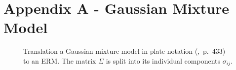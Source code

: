 \section*{Appendix A - Gaussian Mixture Model}

\vspace*{1em}
\begin{figure}[h!]
\centering
\scalebox{\tikzScale}{\adjustTikzSize }
\caption[Gaussian mixture model plate model to ERM translation]{Translation a Gaussian mixture model in plate notation (\cite{bishop2006pattern},~p.~433) to an ERM. The matrix $\Sigma$ is split into its individual components $\sigma_{ij}$.}\label{fig:gaussian_mixture}
\end{figure}